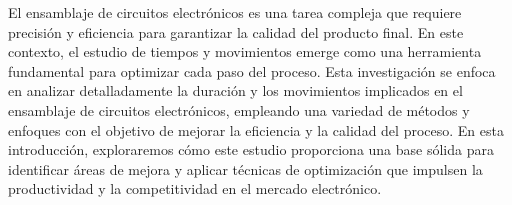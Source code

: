     El ensamblaje de circuitos electrónicos es una tarea compleja que requiere precisión y eficiencia para garantizar la calidad del producto final. En este contexto, el estudio de tiempos y movimientos emerge como una herramienta fundamental para optimizar cada paso del proceso. Esta investigación se enfoca en analizar detalladamente la duración y los movimientos implicados en el ensamblaje de circuitos electrónicos, empleando una variedad de métodos y enfoques con el objetivo de mejorar la eficiencia y la calidad del proceso. En esta introducción, exploraremos cómo este estudio proporciona una base sólida para identificar áreas de mejora y aplicar técnicas de optimización que impulsen la productividad y la competitividad en el mercado electrónico.
